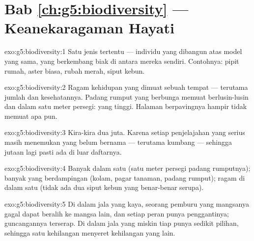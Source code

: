 \section*{Bab \ref{ch:g5:biodiversity} --- Keanekaragaman Hayati}

\begin{solution}{exo:g5:biodiversity:1}
Satu jenis  tertentu --- individu yang dibangun atas
model yang sama, yang berkembang biak di antara mereka sendiri.
Contohnya:  pipit rumah,  aster biasa, rubah merah, siput
kebun.
\end{solution}

\begin{solution}{exo:g5:biodiversity:2}
Ragam kehidupan yang dimuat sebuah tempat --- terutama jumlah
 dan kesehatannya. Padang rumput yang berbunga memuat
berlusin-lusin   dan  dalam satu meter persegi:
 yang tinggi. Halaman berpavingnya hampir tidak
memuat apa pun.
\end{solution}

\begin{solution}{exo:g5:biodiversity:3}
Kira-kira dua juta. Karena setiap penjelajahan yang serius masih
menemukan  yang belum bernama --- terutama kumbang --- sehingga
jutaan lagi pasti ada di luar daftarnya.
\end{solution}

\begin{solution}{exo:g5:biodiversity:4}
Banyak  dalam satu  (satu meter persegi padang
rumputnya); banyak  yang berdampingan (kolam, pagar tanaman,
padang rumput); ragam di dalam satu  (tidak ada dua 
siput kebun yang benar-benar serupa).
\end{solution}

\begin{solution}{exo:g5:biodiversity:5}
Di dalam jala yang kaya, seorang pemburu yang mangsanya gagal dapat
beralih ke mangsa lain, dan setiap peran punya penggantinya;
guncangannya terserap. Di dalam jala yang miskin tiap  punya
sedikit pilihan, sehingga satu kehilangan menyeret kehilangan yang
lain.
\end{solution}

